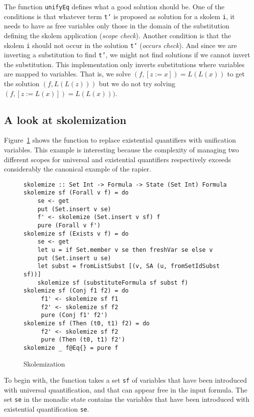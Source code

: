 \documentclass[sigconf, anonymous, review]{acmart}
\newcommand{\tc}[1]{{\small\texttt{#1}}}
\begin{document}
The function \tc{unifyEq} defines what a good solution should be.
One of the conditions is that whatever term \tc{t'} is proposed
as solution for a skolem \tc{i}, it needs to have as free variables only those in the
domain of the substitution defining the skolem application
(\textit{scope check}). Another
condition is that the skolem \tc{i} should not occur in the solution
\tc{t'} (\textit{occurs check}). And since we are inverting a substitution to find
\tc{t'}, we might not find solutions if we cannot invert the
substitution. This implementation only inverts substitutions where
variables are mapped to variables. That is, we solve $(f, [z:=x]) = L(L(x))$
to get the solution $(f, L(L(z)))$ but we do not try solving $(f, [z:=L(x)]) = L(L(x)))$.


\subsection{A look at skolemization}

Figure~\ref{skolemization} shows the function to replace existential quantifiers
with unification variables. This example is interesting because the complexity of
managing two different scopes for universal and existential quantifiers
respectively exceeds considerably the canonical example of the rapier.

\begin{figure}
\begin{verbatim}
skolemize :: Set Int -> Formula -> State (Set Int) Formula
skolemize sf (Forall v f) = do
    se <- get
    put (Set.insert v se)
    f' <- skolemize (Set.insert v sf) f
    pure (Forall v f')
skolemize sf (Exists v f) = do
    se <- get
    let u = if Set.member v se then freshVar se else v
    put (Set.insert u se)
    let subst = fromListSubst [(v, SA (u, fromSetIdSubst sf))]
    skolemize sf (substituteFormula sf subst f)
skolemize sf (Conj f1 f2) = do
     f1' <- skolemize sf f1
     f2' <- skolemize sf f2
     pure (Conj f1' f2')
skolemize sf (Then (t0, t1) f2) = do
     f2' <- skolemize sf f2
     pure (Then (t0, t1) f2')
skolemize _ f@Eq{} = pure f
\end{verbatim}
\caption{Skolemization}
\label{skolemization}
\end{figure}

To begin with, the function takes a set \tc{sf} of variables that have been
introduced with universal quantification, and that can appear free in the
input formula. The set \tc{se} in the monadic state contains the variables
that have been introduced with existential quantification \tc{se}.
\end{document}
